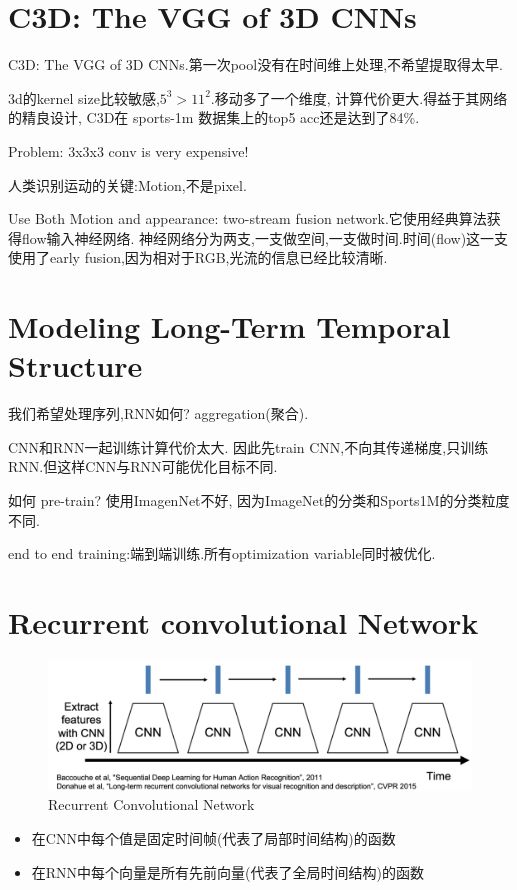 \section{C3D: The VGG of 3D CNNs}

C3D: The VGG of 3D CNNs.第一次pool没有在时间维上处理,不希望提取得太早.

3d的kernel size比较敏感,$5^3 > 11^2$.移动多了一个维度,
计算代价更大.得益于其网络的精良设计,
C3D在 sports-1m 数据集上的top5 acc还是达到了84\%.

Problem: 3x3x3 conv is very expensive!

人类识别运动的关键:Motion,不是pixel.

Use Both Motion and appearance: two-stream fusion network.它使用经典算法获得flow输入神经网络.
神经网络分为两支,一支做空间,一支做时间.时间(flow)这一支使用了early fusion,因为相对于RGB,光流的信息已经比较清晰.

\section{Modeling Long-Term Temporal Structure}

我们希望处理序列,RNN如何? aggregation(聚合).

CNN和RNN一起训练计算代价太大.
因此先train CNN,不向其传递梯度,只训练RNN.但这样CNN与RNN可能优化目标不同.

如何 pre-train? 使用ImagenNet不好, 因为ImageNet的分类和Sports1M的分类粒度不同.

end to end training:端到端训练.所有optimization variable同时被优化.

\section{Recurrent convolutional Network}

\begin{figure}[htbp]
    \centering
    \includegraphics[scale=0.2]{figures/recur_CNN.png}
    \caption{Recurrent Convolutional Network}
\end{figure}

\begin{itemize}
    \item 在CNN中每个值是固定时间帧(代表了局部时间结构)的函数 
    \item 在RNN中每个向量是所有先前向量(代表了全局时间结构)的函数
\end{itemize}

